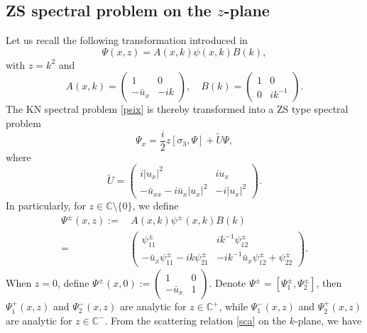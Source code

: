 \documentclass[preprint,compress,12pt]{elsarticle}
\numberwithin{equation}{section}
\begin{document}
\subsection{ZS spectral problem on the $z$-plane}\label{sub23}
Let us recall the following transformation introduced in \cite{Chengglo}
\begin{equation}\label{trans}
\Psi(x,z)=A(x,k)\psi(x,k)B(k),
\end{equation}
with $z=k^{2}$ and
\begin{equation*}
A(x,k)=\begin{pmatrix}1&0\\-\bar{u}_{x}&-ik\end{pmatrix},\quad B(k)=\begin{pmatrix}1&0\\0&ik^{-1}\end{pmatrix}.
\end{equation*}
The KN spectral problem \eqref{psix} is thereby transformed into a ZS type spectral problem
\begin{equation}\label{Ps}
\Psi_{x}=\frac{i}{2}z\left[\sigma_{3},\Psi\right]+\widetilde{U}\Psi,
\end{equation}
where
\begin{equation*}
\widetilde{U}=\begin{pmatrix}i|u_{x}|^{2}&iu_{x}\\-\bar{u}_{xx}-i\bar{u}_{x}|u_{x}|^{2}&-i|u_{x}|^{2}\end{pmatrix}.
\end{equation*}
In particularly, for $z\in\mathbb{C}\setminus\{0\}$, we define
\begin{equation}
\begin{aligned}
\Psi^{\pm}(x,z):=&\,A(x,k)\psi^{\pm}(x,k)B(k)\\
=&\begin{pmatrix}\psi_{11}^{\pm}&ik^{-1}\psi_{12}^{\pm}\\
-\bar{u}_{x}\psi_{11}^{\pm}-ik\psi_{21}^{\pm}&-ik^{-1}\bar{u}_{x}\psi_{12}^{\pm}+\psi_{22}^{\pm}
\end{pmatrix}.
\end{aligned}
\end{equation}
When $z=0$, define $\Psi^{\pm}(x,0):=\begin{pmatrix}1&0\\-\bar{u}_{x}&1\end{pmatrix}$. Denote $\Psi^{\pm}=\left[\Psi_{1}^{\pm},\Psi_{2}^{\pm}\right]$, then $\Psi_{1}^{+}(x,z)$ and $\Psi_{2}^{-}(x,z)$ are analytic for $z\in \mathbb{C}^{+}$, while $\Psi_{1}^{-}(x,z)$ and $\Psi_{2}^{+}(x,z)$ are analytic for $z\in \mathbb{C}^{-}$. From the scattering relation \eqref{sca} on the $k$-plane, we have
\end{document}
